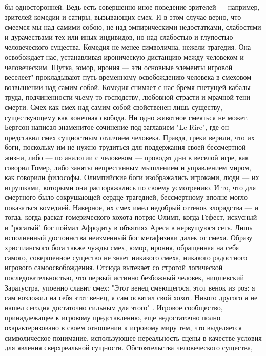 \documentclass[12pt]{article}
\begin{document}
бы односторонней. Ведь есть совершенно иное поведение зрителей --- например, зрителей комедии и сатиры,
вызывающих  смех.  И  в  этом  случае  верно,  что  смеемся  мы  над  самими  собою,  не  над  эмпирическими
недостатками,  слабостями  и  дурачествами  тех  или  иных  индивидов,  но  над  слабостью  и  глупостью
человеческого существа. Комедия не менее символична, нежели трагедия. Она освобождает нас, устанавливая
ироническую дистанцию между человеком и человеческим. Шутка, юмор, ирония --- эти основные элементы
игровой веселеет" прокладывают путь временному освобождению человека в смеховом возвышении над самим
собой. Комедия снимает с нас бремя гнетущей кабалы труда, подчиненности чьему-то господству, любовной
страсти и мрачной тени смерти. Смех как смех-над-самим-собой свойственен лишь существу, существующему
как  конечная  свобода.  Ни  одно  животное  смеяться  не  может.  Бергсон  написал  знаменитое  сочинение  под
заглавием "Le Rire", где он представил смех сущностным отличием человека. Правда, греки верили, что их боги,
поскольку им не нужно трудиться для поддержания своей бессмертной жизни, либо --- по аналогии с человеком
--- проводят дни в веселой игре, как говорил Гомер, либо заняты непрестанным мышлением и управлением
миром, как говорили философы. Олимпийские боги изображались игроками, люди --- их игрушками, которыми
они распоряжались по своему усмотрению. И то, что для смертного было сокрушающей сердце трагедией,
бессмертному вполне могло показаться комедией. Наверное, их смех имел недобрый оттенок злорадства --- и
тогда,  когда  раскат  гомерического  хохота  потряс  Олимп,  когда  Гефест,  искусный  и  "рогатый"  бог  поймал
Афродиту в объятиях Ареса в нервущуюся сеть. Лишь исполненный достоинства неизменный бог метафизики
далек от смеха. Образу христианского бога также чужды смех, юмор, ирония, обращенная на себя самого,
совершенное существо не знает никакого смеха, никакого радостного игрового самоосвобождения.
Отсюда  вытекает  со  строгой  логической  последовательностью,  что  первый  истинно  безбожный  человек,
ницшевский Заратустра, упоенно славит смех: "Этот венец смеющегося, этот венок из роз: я сам возложил на
себя этот венец, я сам освятил свой хохот. Никого другого я не нашел сегодня достаточно сильным для этого" .
Игровое сообщество, принадлежащее к игровому представлению, еще недостаточно полно охарактеризовано в
своем отношении к игровому миру тем, что выделяется символическое понимание, использующее нереальность
сцены  в  качестве  условия  для  явления  сверхреальной  сущности.  Обстоятельства  человеческого  существа,
\end{document}

